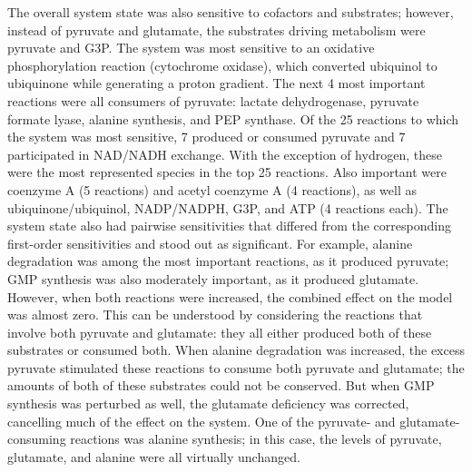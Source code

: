 \documentclass[12pt]{article}
\begin{document}
The overall system state was also sensitive to cofactors and substrates; however, instead of pyruvate and glutamate, the substrates driving metabolism were pyruvate and G3P.
The system was most sensitive to an oxidative phosphorylation reaction (cytochrome oxidase), which converted ubiquinol to ubiquinone while generating a proton gradient.
The next 4 most important reactions were all consumers of pyruvate: lactate dehydrogenase, pyruvate formate lyase, alanine synthesis, and PEP synthase.
Of the 25 reactions to which the system was most sensitive, 7 produced or consumed pyruvate and 7 participated in NAD/NADH exchange.
With the exception of hydrogen, these were the most represented species in the top 25 reactions.
Also important were coenzyme A (5 reactions) and acetyl coenzyme A (4 reactions), as well as ubiquinone/ubiquinol, NADP/NADPH, G3P, and ATP  (4 reactions each).
The system state also had pairwise sensitivities that differed from the corresponding first-order sensitivities and stood out as significant.
For example, alanine degradation was among the most important reactions, as it produced pyruvate; GMP synthesis was also moderately important, as it produced glutamate.
However, when both reactions were increased, the combined effect on the model was almost zero.
This can be understood by considering the reactions that involve both pyruvate and glutamate: they all either produced both of these substrates or consumed both.
When alanine degradation was increased, the excess pyruvate stimulated these reactions to consume both pyruvate and glutamate; the amounts of both of these substrates could not be conserved.
But when GMP synthesis was perturbed as well, the glutamate deficiency was corrected, cancelling much of the effect on the system.
One of the pyruvate- and glutamate-consuming reactions was alanine synthesis; in this case, the levels of pyruvate, glutamate, and alanine were all virtually unchanged.
\end{document}
